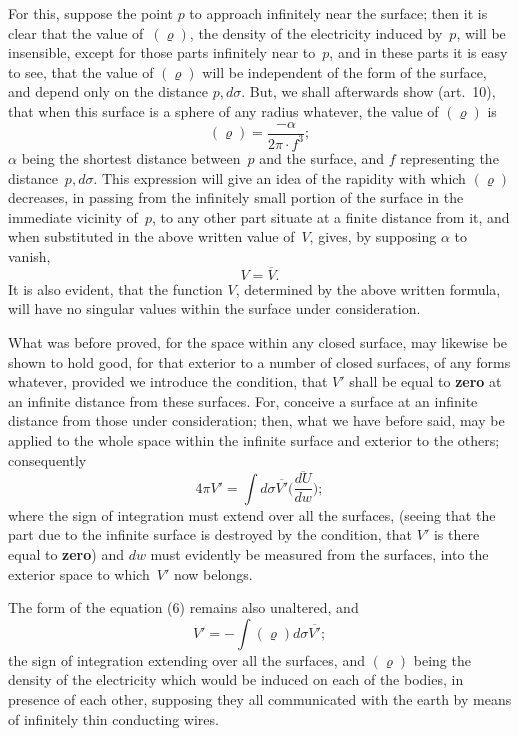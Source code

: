 \documentclass[11pt,notitlepage]{amsart}
\let\Emphasis\textbf
\renewcommand{\rho}{\varrho}
\begin{document}
For this, suppose the point $p$ to approach infinitely near the surface;
then it is clear that the value of~$(\rho)$,
the density of the electricity induced
by~$p$, will be insensible,
except for those parts infinitely near to~$p$, and in
these parts it is easy to see,
that the value of $(\rho)$ will be independent of the
form of the surface, and depend only on the distance $p,d\sigma$.
But, we shall
afterwards show (art.~10), that when this surface is a sphere of any radius
whatever, the value of $(\rho)$ is
\[
(\rho)=\frac{-\alpha}{2\pi\cdot f^3};
\]
$\alpha$ being the shortest distance between~$p$ and the surface,
and $f$ representing
the distance~$p,d\sigma$.
This expression will give an idea of the rapidity with
which $(\rho)$ decreases,
in passing from the infinitely small portion of the surface
in the immediate vicinity of~$p$,
to any other part situate at a finite distance
from it, and when substituted in the above written value of~$V$, gives, by
supposing $\alpha$ to vanish,
\[
V=\overline{V}.
\]
It is also evident, that the function $V$, determined by the above written 
formula, will have no singular values within the surface under consideration.

What was before proved, for the space within any closed surface,
may likewise be shown to hold good, for that exterior to a number of closed
surfaces, of any forms whatever, provided we introduce the condition, that $V'$
shall be equal to \Emphasis{zero}
at an infinite distance from these surfaces. For, 
conceive a surface at an infinite distance from those under consideration; then,
what we have before said, may be applied to the whole space within the
infinite surface and exterior to the others; consequently
\[
\tag{5'.}
4\pi V'=\int d\sigma\overline{V'}
\biggl(\frac{\overline{dU}}{dw}\biggr);
\]
where the sign of integration must extend over all the surfaces, (seeing that
the part due to the infinite surface is destroyed by the condition, that $V'$ is
there equal to \Emphasis{zero})
and $dw$ must evidently be measured from the surfaces,
into the exterior space to which~$V'$ now belongs.

The form of the equation (6) remains also unaltered, and
\[
\tag{6'.}
V'=-\int(\rho)d\sigma\overline{V'};
\]
the sign of integration extending over all the surfaces,
and $(\rho)$ being the density
of the electricity which would be induced
on each of the bodies, in presence
of each other, supposing they all communicated with the earth by means of
infinitely thin conducting wires.
\bigskip
\end{document}
